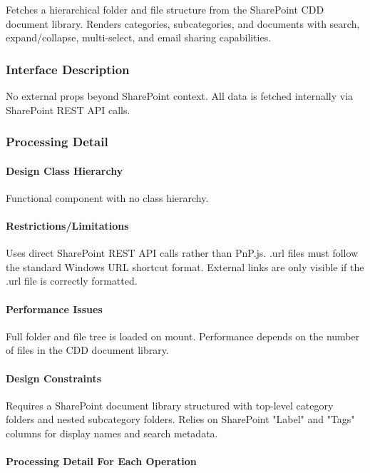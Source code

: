 \documentclass[12pt]{article}
\begin{document}
Fetches a hierarchical folder and file structure from the SharePoint CDD document library. Renders categories, subcategories, and documents with search, expand/collapse, multi-select, and email sharing capabilities.

\subsubsection{Interface Description}

No external props beyond SharePoint context. All data is fetched internally via SharePoint REST API calls.

\subsubsection{Processing Detail}

\paragraph{Design Class Hierarchy}

Functional component with no class hierarchy.

\paragraph{Restrictions/Limitations}

Uses direct SharePoint REST API calls rather than PnP.js. .url files must follow the standard Windows URL shortcut format. External links are only visible if the .url file is correctly formatted.

\paragraph{Performance Issues}

Full folder and file tree is loaded on mount. Performance depends on the number of files in the CDD document library.

\paragraph{Design Constraints}

Requires a SharePoint document library structured with top-level category folders and nested subcategory folders. Relies on SharePoint "Label" and "Tags" columns for display names and search metadata.

\paragraph{Processing Detail For Each Operation}
\end{document}
